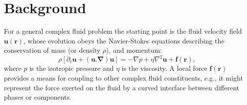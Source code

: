 \section{Background}\label{ch14:sec:background}



For a general complex fluid problem the starting point is the
fluid velocity field $\mathbf{u}(\mathbf{r})$, whose evolution
obeys the Navier-Stokes equations describing the conservation of mass
(or density $\rho$), and momentum:
\begin{equation}
\rho  [ \partial_t \mathbf{u} + (\mathbf{u}.\mathbf{\nabla})\mathbf{u} ]
= -\nabla p + \eta \nabla^2 \mathbf{u} + \mathbf{f}(\mathbf{r}),
\end{equation}
where $p$ is the isotropic pressure and $\eta$ is the viscosity.
A local force $\mathbf{f}(\mathbf{r})$ provides a means for coupling
to other complex fluid constituents, e.g., it might represent the force
exerted on the fluid by a curved interface between different phases or
components.

